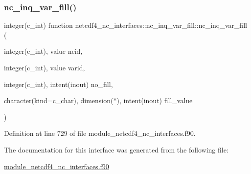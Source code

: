 \subsubsection{\texorpdfstring{nc\+\_\+inq\+\_\+var\+\_\+fill()}{nc\_inq\_var\_fill()}}
{\footnotesize\ttfamily integer(c\+\_\+int) function netcdf4\+\_\+nc\+\_\+interfaces\+::nc\+\_\+inq\+\_\+var\+\_\+fill\+::nc\+\_\+inq\+\_\+var\+\_\+fill (\begin{DoxyParamCaption}\item[{integer(c\+\_\+int), value}]{ncid,  }\item[{integer(c\+\_\+int), value}]{varid,  }\item[{integer(c\+\_\+int), intent(inout)}]{no\+\_\+fill,  }\item[{character(kind=c\+\_\+char), dimension($\ast$), intent(inout)}]{fill\+\_\+value }\end{DoxyParamCaption})}



Definition at line 729 of file module\+\_\+netcdf4\+\_\+nc\+\_\+interfaces.\+f90.



The documentation for this interface was generated from the following file\+:\begin{DoxyCompactItemize}
\item 
\hyperlink{module__netcdf4__nc__interfaces_8f90}{module\+\_\+netcdf4\+\_\+nc\+\_\+interfaces.\+f90}\end{DoxyCompactItemize}
